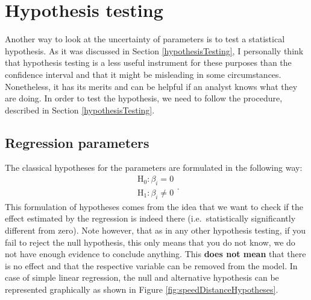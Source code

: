 \documentclass[
]{book}
\theoremstyle{definition}
\theoremstyle{definition}
\theoremstyle{definition}
\theoremstyle{definition}
\theoremstyle{remark}
\begin{document}
\section{Hypothesis testing}\label{uncertaintyHypothesis}

Another way to look at the uncertainty of parameters is to test a statistical hypothesis. As it was discussed in Section \ref{hypothesisTesting}, I personally think that hypothesis testing is a less useful instrument for these purposes than the confidence interval and that it might be misleading in some circumstances. Nonetheless, it has its merits and can be helpful if an analyst knows what they are doing. In order to test the hypothesis, we need to follow the procedure, described in Section \ref{hypothesisTesting}.

\subsection{Regression parameters}\label{regression-parameters}

The classical hypotheses for the parameters are formulated in the following way:
\begin{equation}
    \begin{aligned}
        \mathrm{H}_0: \beta_i = 0 \\
        \mathrm{H}_1: \beta_i \neq 0
    \end{aligned} .
    \label{eq:regressionHypothesis01}
\end{equation}
This formulation of hypotheses comes from the idea that we want to check if the effect estimated by the regression is indeed there (i.e.~statistically significantly different from zero). Note however, that as in any other hypothesis testing, if you fail to reject the null hypothesis, this only means that you do not know, we do not have enough evidence to conclude anything. This \textbf{does not mean} that there is no effect and that the respective variable can be removed from the model. In case of simple linear regression, the null and alternative hypothesis can be represented graphically as shown in Figure \ref{fig:speedDistanceHypotheses}.
\end{document}
